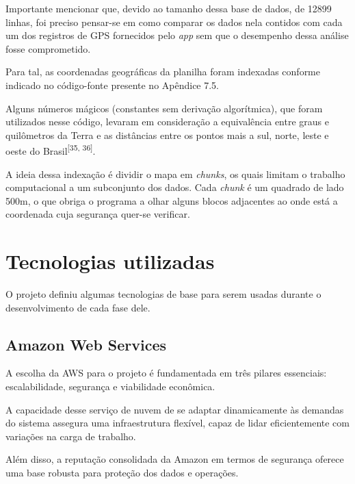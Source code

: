 Importante mencionar que, devido ao tamanho dessa base de dados, de 12899 linhas, foi preciso pensar-se em como comparar os dados nela contidos com cada um dos registros de GPS fornecidos pelo \textit{app} sem que o desempenho dessa análise fosse comprometido.

Para tal, as coordenadas geográficas da planilha foram indexadas conforme indicado no código-fonte presente no Apêndice 7.5.

Alguns números mágicos (constantes sem derivação algorítmica), que foram utilizados nesse código, levaram em consideração a equivalência entre graus e quilômetros da Terra e as distâncias entre os pontos mais a sul, norte, leste e oeste do Brasil\textsuperscript{[35, 36]}.

A ideia dessa indexação é dividir o mapa em \textit{chunks}, os quais limitam o trabalho computacional a um subconjunto dos dados. Cada \textit{chunk} é um quadrado de lado 500m, o que obriga o programa a olhar alguns blocos adjacentes ao onde está a coordenada cuja segurança quer-se verificar.

    
    
    

 
\section{Tecnologias utilizadas}
O projeto definiu algumas tecnologias de base para serem usadas durante o desenvolvimento de cada fase dele.

    \subsection{Amazon Web Services}

    A escolha da AWS para o projeto é fundamentada em três pilares essenciais: escalabilidade, segurança e viabilidade econômica. 
    
    A capacidade desse serviço de nuvem de se adaptar dinamicamente às demandas do sistema assegura uma infraestrutura flexível, capaz de lidar eficientemente com variações na carga de trabalho. 
    
    Além disso, a reputação consolidada da Amazon em termos de segurança oferece uma base robusta para proteção dos dados e operações. 
    
